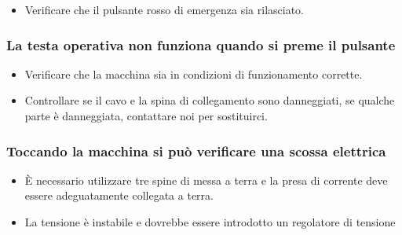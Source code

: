 \documentclass[a4paper]{article}
\begin{document}
\begin{itemize}
  \item Verificare che il pulsante rosso di emergenza sia rilasciato.
\end{itemize}

\subsubsection{La testa operativa non funziona quando si preme il pulsante}
\begin{itemize}
  \item Verificare che la macchina sia in condizioni di funzionamento corrette.
  \item Controllare se il cavo e la spina di collegamento sono danneggiati, se qualche parte è danneggiata, contattare noi per sostituirci.
\end{itemize}

\subsubsection{Toccando la macchina si può verificare una scossa elettrica}
\begin{itemize}
  \item È necessario utilizzare tre spine di messa a terra e la presa di corrente deve essere adeguatamente collegata a terra.
  \item La tensione è instabile e dovrebbe essere introdotto un regolatore di tensione
\end{itemize}




\end{document}
